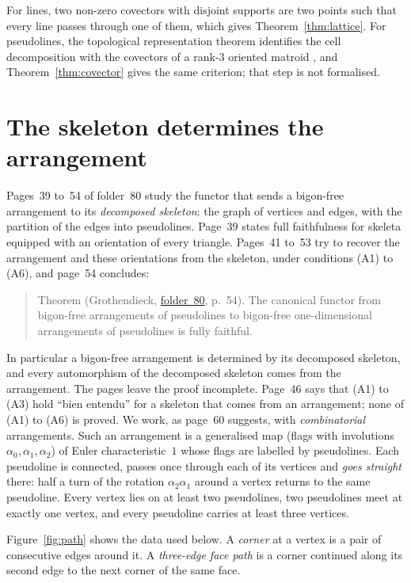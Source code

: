 \documentclass[11pt,a4paper]{amsart}
\theoremstyle{definition}
\theoremstyle{remark}
\newcommand{\fac}[1]{\href{https://grothendieck.umontpellier.fr/#1.pdf}{folder~#1}}
\begin{document}
For lines, two non-zero covectors with disjoint supports are two points such that every line passes through one of them, which gives Theorem~\ref{thm:lattice}. For pseudolines, the topological representation theorem \cite{folkmanlawrence1978} identifies the cell decomposition with the covectors of a rank-$3$ oriented matroid \cite{bjorner1999}, and Theorem~\ref{thm:covector} gives the same criterion; that step is not formalised.

\section{The skeleton determines the arrangement}\label{sec:skeleton}

Pages~39 to~54 of folder~80 study the functor that sends a bigon-free arrangement to its \emph{decomposed skeleton}: the graph of vertices and edges, with the partition of the edges into pseudolines. Page~39 states full faithfulness for skeleta equipped with an orientation of every triangle. Pages~41 to~53 try to recover the arrangement and these orientations from the skeleton, under conditions (A1) to (A6), and page~54 concludes:

\begin{quote}
Theorem (Grothendieck, \fac{80}, p.~54). The canonical functor from bigon-free arrangements of pseudolines to bigon-free one-dimensional arrangements of pseudolines is fully faithful.
\end{quote}

In particular a bigon-free arrangement is determined by its decomposed skeleton, and every automorphism of the decomposed skeleton comes from the arrangement. The pages leave the proof incomplete. Page~46 says that (A1) to (A3) hold ``bien entendu'' for a skeleton that comes from an arrangement; none of (A1) to (A6) is proved. We work, as page~60 suggests, with \emph{combinatorial} arrangements. Such an arrangement is a generalised map \cite{lienhardt1994} (flags with involutions $\alpha_0, \alpha_1, \alpha_2$) of Euler characteristic~$1$ whose flags are labelled by pseudolines. Each pseudoline is connected, passes once through each of its vertices and \emph{goes straight} there: half a turn of the rotation $\alpha_2\alpha_1$ around a vertex returns to the same pseudoline. Every vertex lies on at least two pseudolines, two pseudolines meet at exactly one vertex, and every pseudoline carries at least three vertices.

Figure~\ref{fig:path} shows the data used below. A \emph{corner} at a vertex is a pair of consecutive edges around it. A \emph{three-edge face path} is a corner continued along its second edge to the next corner of the same face.
\end{document}
